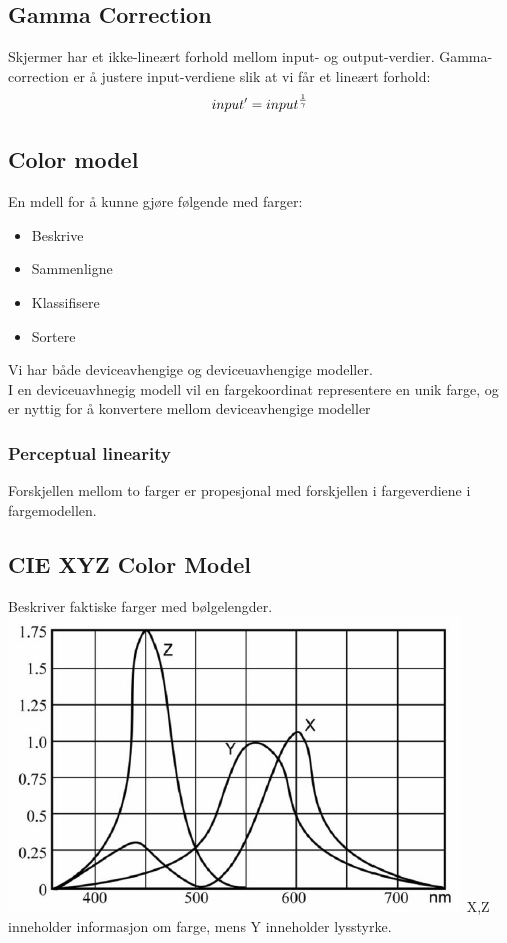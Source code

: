 \subsection{Gamma Correction}
Skjermer har et ikke-lineært forhold mellom input- og output-verdier. Gamma-correction er å justere input-verdiene slik at vi får et lineært forhold:
\begin{equation}
    input' = input^{1 \over \gamma}
\end{equation}

\subsection{Color model}
En mdell for å kunne gjøre følgende med farger:
\begin{itemize}
    \item Beskrive
    \item Sammenligne
    \item Klassifisere
    \item Sortere
\end{itemize}
Vi har både deviceavhengige og deviceuavhengige modeller.\\
I en deviceuavhnegig modell vil en fargekoordinat representere en unik farge, og er nyttig for å konvertere mellom deviceavhengige modeller

\subsubsection{Perceptual linearity}
Forskjellen mellom to farger er propesjonal med forskjellen i fargeverdiene i fargemodellen.

\subsection{CIE XYZ Color Model}
Beskriver faktiske farger med bølgelengder.
\\ \includegraphics[width=\textwidth]{Bilder/cie.png}
X,Z inneholder informasjon om farge, mens Y inneholder lysstyrke.

